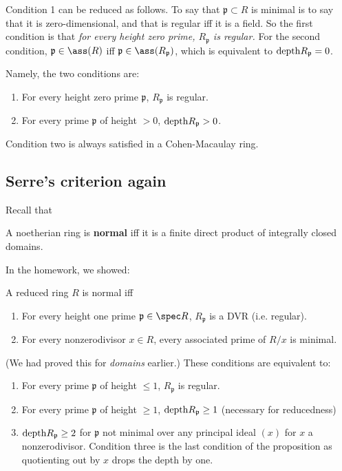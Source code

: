 Condition 1 can be reduced as follows. To say that $\mathfrak{p} \subset R$ is
minimal is to say that it is zero-dimensional, and that is regular iff it is a
field. So the first condition is that \emph{for every height zero prime,
$R_{\mathfrak{p}}$ is regular.}  For the second condition, $\mathfrak{p} \in
\ass(R)$ iff $\mathfrak{p} \in \ass(R_{\mathfrak{p}})$, which is equivalent to
$\mathrm{depth} R_{\mathfrak{p}} = 0$. 

Namely, the two conditions are:
\begin{enumerate}
\item For every height zero prime $\mathfrak{p} $, $R_{\mathfrak{p}}$ is
regular.
\item For every prime $\mathfrak{p}$ of height $>0$, $\mathrm{depth} R_{\mathfrak{p}} >
0$.
\end{enumerate}

Condition two is always satisfied in a Cohen-Macaulay ring. 

\subsection{Serre's criterion again}

Recall that
\begin{definition} 
A noetherian ring is \textbf{normal} iff it is a finite direct product of
integrally closed domains.
\end{definition} 

In the homework, we showed:
\begin{proposition} 
A reduced ring $R$ is normal iff 
\begin{enumerate}
\item For every height one prime $\mathfrak{p}  \in \spec R$,
$R_{\mathfrak{p}}$ is a DVR (i.e. regular).
\item For every nonzerodivisor $x \in R$, every associated prime of $R/x$ is
minimal.
\end{enumerate}
\end{proposition} 
(We had proved this for \emph{domains} earlier.)
These conditions are equivalent to:
\begin{enumerate}
\item For every prime $\mathfrak{p}$ of height $\leq 1$, $R_{\mathfrak{p}} $ is regular.
\item For every prime $\mathfrak{p}$ of height $\geq 1$, $\mathrm{depth}
R_{\mathfrak{p}} \geq 1$ (necessary for reducedness)
\item  $\mathrm{depth} R_{\mathfrak{p}} \geq 2$ for $\mathfrak{p}$ not minimal over any
principal ideal $(x)$ for $x$ a nonzerodivisor. Condition three is the last
condition of the proposition as quotienting out by $x$ drops the depth by one.
\end{enumerate}

